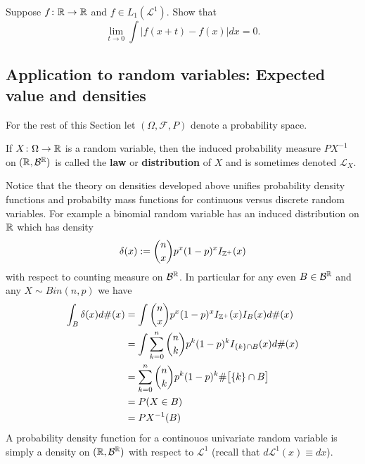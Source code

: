 \begin{exercise}
Suppose $f\colon \Bbb R\rightarrow \Bbb R$ and $f\in L_1(\mathcal L^1)$. Show that
\[\lim_{t\rightarrow 0} \int |f(x+t)- f(x)| dx=0. \]
\end{exercise}







\subsection{Application to random variables: Expected value and densities}
\label{app1}

\begin{sectionassumption} For the rest of this Section let $(\Omega, \mathcal F, P)$ denote a probability space.
\end{sectionassumption}

\begin{definition}[\bf Distribution of $X$]
If $X\colon \Omega\rightarrow \Bbb R$ is a random variable, then the induced probability measure $P\!X^{-1}$ on $(\Bbb R, \mathcal B^{\Bbb R})$ is called the {\bf law} or {\bf distribution} of $X$ and is sometimes denoted $\mathcal L_X$.
\end{definition}

Notice that the theory on densities developed above unifies probability density functions and probabilty mass functions for continuous versus discrete random variables. For example a binomial random variable has an induced distribution on $\Bbb R$ which has density
\[
\delta(x):= {n \choose x} p^x (1-p)^x I_{\Bbb Z^+}(x)
\]
with respect to counting measure on $\mathcal B^{\Bbb R}$.
In particular for any even $B\in \mathcal B^{\Bbb R}$ and any $X\sim Bin(n, p)$ we have
\begin{align*}
\int_B \delta(x)d\#(x)
& =\int {n \choose x} p^x (1-p)^x I_{\Bbb Z^+}(x)I_B(x) d\#(x)  \\
& =\int  \sum_{k=0}^n {n \choose k} p^k (1-p)^k I_{\{k\}\cap B}(x)  d\#(x)  \\
&= \sum_{k=0}^n {n \choose k} p^k (1-p)^k \#\bigl[\{k\}\cap B\bigr]\\
&= P(X\in B) \\
& = PX^{-1}(B)
\end{align*}
A probability density function for a continouos univariate random variable is simply a density on $(\Bbb R, \mathcal B^{\Bbb R})$ with respect to $\mathcal L^1$ (recall that $d\mathcal L^1(x)\equiv dx$).



